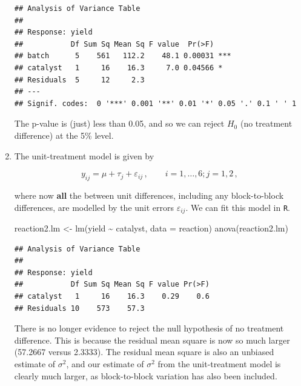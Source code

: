 \documentclass[
]{book}
\newenvironment{Shaded}{\begin{snugshade}}{\end{snugshade}}
\newcommand{\AttributeTok}[1]{\textcolor[rgb]{0.77,0.63,0.00}{#1}}
\newcommand{\FunctionTok}[1]{\textcolor[rgb]{0.00,0.00,0.00}{#1}}
\newcommand{\NormalTok}[1]{#1}
\newcommand{\OtherTok}[1]{\textcolor[rgb]{0.56,0.35,0.01}{#1}}
\newcommand{\SpecialCharTok}[1]{\textcolor[rgb]{0.00,0.00,0.00}{#1}}
\theoremstyle{definition}
\theoremstyle{definition}
\theoremstyle{definition}
\theoremstyle{definition}
\theoremstyle{remark}
\begin{document}
\begin{enumerate}
\begin{verbatim}
## Analysis of Variance Table
## 
## Response: yield
##           Df Sum Sq Mean Sq F value  Pr(>F)    
## batch      5    561   112.2    48.1 0.00031 ***
## catalyst   1     16    16.3     7.0 0.04566 *  
## Residuals  5     12     2.3                    
## ---
## Signif. codes:  0 '***' 0.001 '**' 0.01 '*' 0.05 '.' 0.1 ' ' 1
\end{verbatim}

  The p-value is (just) less than 0.05, and so we can reject \(H_0\) (no treatment difference) at the 5\% level.
\item
  The unit-treatment model is given by

  \[
  y_{ij} = \mu + \tau_j + \varepsilon_{ij}\,,\qquad i = 1,\ldots, 6; j = 1,2\,,
   \]

  where now \textbf{all} the between unit differences, including any block-to-block differences, are modelled by the unit errors \(\varepsilon_{ij}\). We can fit this model in \texttt{R}.

\begin{Shaded}
\begin{Highlighting}[]
\NormalTok{reaction2.lm }\OtherTok{\textless{}{-}} \FunctionTok{lm}\NormalTok{(yield }\SpecialCharTok{\textasciitilde{}}\NormalTok{ catalyst, }\AttributeTok{data =}\NormalTok{ reaction)}
\FunctionTok{anova}\NormalTok{(reaction2.lm)}
\end{Highlighting}
\end{Shaded}

\begin{verbatim}
## Analysis of Variance Table
## 
## Response: yield
##           Df Sum Sq Mean Sq F value Pr(>F)
## catalyst   1     16    16.3    0.29    0.6
## Residuals 10    573    57.3
\end{verbatim}

  There is no longer evidence to reject the null hypothesis of no treatment difference. This is because the residual mean square is now so much larger (57.2667 versus 2.3333). The residual mean square is also an unbiased estimate of \(\sigma^2\), and our estimate of \(\sigma^2\) from the unit-treatment model is clearly much larger, as block-to-block variation has also been included.
\end{enumerate}
\end{document}
